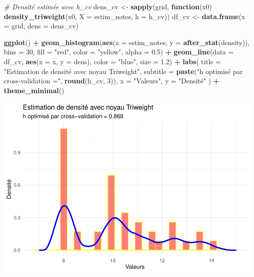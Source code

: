 \documentclass[
  12pt,
]{article}
\newenvironment{Shaded}{\begin{snugshade}}{\end{snugshade}}
\newcommand{\AttributeTok}[1]{\textcolor[rgb]{0.13,0.29,0.53}{#1}}
\newcommand{\CommentTok}[1]{\textcolor[rgb]{0.56,0.35,0.01}{\textit{#1}}}
\newcommand{\ControlFlowTok}[1]{\textcolor[rgb]{0.13,0.29,0.53}{\textbf{#1}}}
\newcommand{\DecValTok}[1]{\textcolor[rgb]{0.00,0.00,0.81}{#1}}
\newcommand{\FloatTok}[1]{\textcolor[rgb]{0.00,0.00,0.81}{#1}}
\newcommand{\FunctionTok}[1]{\textcolor[rgb]{0.13,0.29,0.53}{\textbf{#1}}}
\newcommand{\NormalTok}[1]{#1}
\newcommand{\OtherTok}[1]{\textcolor[rgb]{0.56,0.35,0.01}{#1}}
\newcommand{\SpecialCharTok}[1]{\textcolor[rgb]{0.81,0.36,0.00}{\textbf{#1}}}
\newcommand{\StringTok}[1]{\textcolor[rgb]{0.31,0.60,0.02}{#1}}
\begin{document}
\begin{Shaded}
\begin{Highlighting}[]
\CommentTok{\# Densité estimée avec h\_cv}
\NormalTok{dens\_cv }\OtherTok{\textless{}{-}} \FunctionTok{sapply}\NormalTok{(grid, }\ControlFlowTok{function}\NormalTok{(x0) }\FunctionTok{density\_triweight}\NormalTok{(x0, }\AttributeTok{X =}\NormalTok{ estim\_notes, }\AttributeTok{h =}\NormalTok{ h\_cv))}
\NormalTok{df\_cv }\OtherTok{\textless{}{-}} \FunctionTok{data.frame}\NormalTok{(}\AttributeTok{x =}\NormalTok{ grid, }\AttributeTok{dens =}\NormalTok{ dens\_cv)}

\FunctionTok{ggplot}\NormalTok{() }\SpecialCharTok{+}
  \FunctionTok{geom\_histogram}\NormalTok{(}\FunctionTok{aes}\NormalTok{(}\AttributeTok{x =}\NormalTok{ estim\_notes, }\AttributeTok{y =} \FunctionTok{after\_stat}\NormalTok{(density)),}
                 \AttributeTok{bins =} \DecValTok{30}\NormalTok{, }\AttributeTok{fill =} \StringTok{"red"}\NormalTok{, }\AttributeTok{color =} \StringTok{"yellow"}\NormalTok{, }\AttributeTok{alpha =} \FloatTok{0.5}\NormalTok{) }\SpecialCharTok{+}
  \FunctionTok{geom\_line}\NormalTok{(}\AttributeTok{data =}\NormalTok{ df\_cv, }\FunctionTok{aes}\NormalTok{(}\AttributeTok{x =}\NormalTok{ x, }\AttributeTok{y =}\NormalTok{ dens),}
            \AttributeTok{color =} \StringTok{"blue"}\NormalTok{, }\AttributeTok{size =} \FloatTok{1.2}\NormalTok{) }\SpecialCharTok{+}
  \FunctionTok{labs}\NormalTok{(}
    \AttributeTok{title =} \StringTok{"Estimation de densité avec noyau Triweight"}\NormalTok{,}
    \AttributeTok{subtitle =} \FunctionTok{paste}\NormalTok{(}\StringTok{"h optimisé par cross{-}validation ="}\NormalTok{, }\FunctionTok{round}\NormalTok{(h\_cv, }\DecValTok{3}\NormalTok{)),}
    \AttributeTok{x =} \StringTok{"Valeurs"}\NormalTok{, }\AttributeTok{y =} \StringTok{"Densité"}
\NormalTok{  ) }\SpecialCharTok{+}
  \FunctionTok{theme\_minimal}\NormalTok{()}
\end{Highlighting}
\end{Shaded}

\includegraphics{Stat_non_para_files/figure-latex/unnamed-chunk-169-1.pdf}
\end{document}
